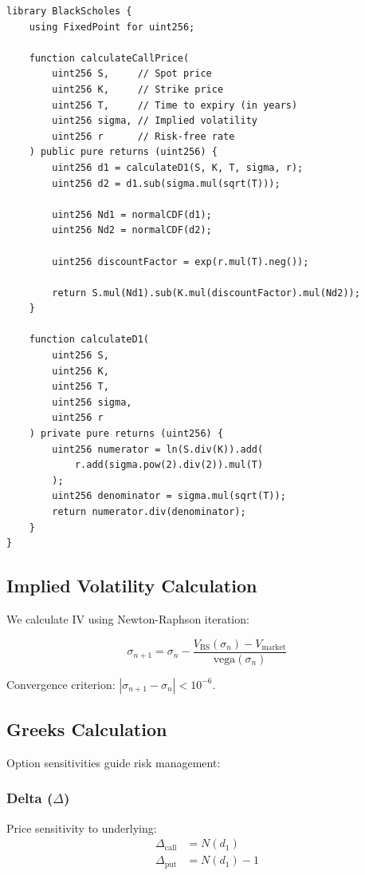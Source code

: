 \begin{lstlisting}[caption={Black-Scholes Implementation}]
library BlackScholes {
    using FixedPoint for uint256;

    function calculateCallPrice(
        uint256 S,     // Spot price
        uint256 K,     // Strike price
        uint256 T,     // Time to expiry (in years)
        uint256 sigma, // Implied volatility
        uint256 r      // Risk-free rate
    ) public pure returns (uint256) {
        uint256 d1 = calculateD1(S, K, T, sigma, r);
        uint256 d2 = d1.sub(sigma.mul(sqrt(T)));

        uint256 Nd1 = normalCDF(d1);
        uint256 Nd2 = normalCDF(d2);

        uint256 discountFactor = exp(r.mul(T).neg());

        return S.mul(Nd1).sub(K.mul(discountFactor).mul(Nd2));
    }

    function calculateD1(
        uint256 S,
        uint256 K,
        uint256 T,
        uint256 sigma,
        uint256 r
    ) private pure returns (uint256) {
        uint256 numerator = ln(S.div(K)).add(
            r.add(sigma.pow(2).div(2)).mul(T)
        );
        uint256 denominator = sigma.mul(sqrt(T));
        return numerator.div(denominator);
    }
}
\end{lstlisting}

\subsection{Implied Volatility Calculation}

We calculate IV using Newton-Raphson iteration:

\begin{equation}
\sigma_{n+1} = \sigma_n - \frac{V_{\text{BS}}(\sigma_n) - V_{\text{market}}}{\text{vega}(\sigma_n)}
\end{equation}

Convergence criterion: $|\sigma_{n+1} - \sigma_n| < 10^{-6}$.

\subsection{Greeks Calculation}

Option sensitivities guide risk management:

\subsubsection{Delta ($\Delta$)}
Price sensitivity to underlying:
\begin{align}
\Delta_{\text{call}} &= N(d_1) \\
\Delta_{\text{put}} &= N(d_1) - 1
\end{align}

